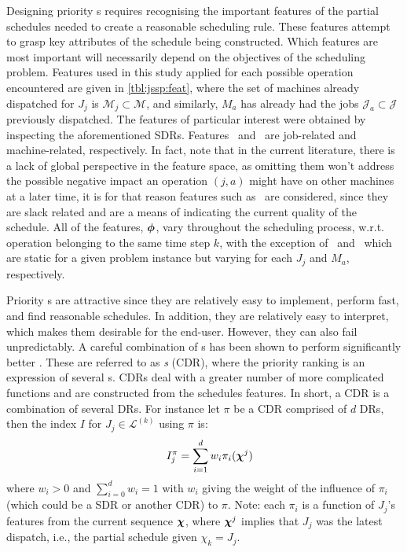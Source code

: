 \documentclass[twocolumn]{svjour3}
\begin{document}
Designing priority \dr s requires recognising the important features of the 
partial schedules needed to create a reasonable scheduling rule. 
These features attempt to grasp key attributes of the schedule being 
constructed. Which features are most important will necessarily depend on the
objectives of the scheduling problem. 
Features used in this study applied for each possible operation encountered 
are given in \cref{tbl:jssp:feat}, where the set of machines already dispatched 
for $J_j$ is $\mathcal{M}_j\subset\mathcal{M}$, and similarly, $M_a$ has 
already had the jobs $\mathcal{J}_a\subset\mathcal{J}$ previously dispatched.
The features of particular interest were obtained by inspecting the 
aforementioned SDRs. Features \phiJobRelated\ and \phiMacRelated\ are 
job-related and machine-related, respectively.
In fact, \cite{Pickardt2013} note that in the current literature, there is a 
lack of global perspective in the feature space, as omitting them won't 
address the possible negative impact an operation $(j,a)$ might have on other 
machines at a later time, it is for that reason features such as 
\phiSlackRelated\ are considered, since they are slack related and are a means 
of indicating the current quality of the schedule.
All of the features, $\bm{\phi}$, vary throughout the scheduling process, 
w.r.t. operation belonging to the same time step $k$, with the exception of 
\phijobTotProcTime\ and \phimacTotProcTime\ which are static for a given 
problem instance but varying for each $J_j$ and $M_a$, respectively. 

Priority \dr s are attractive since they are relatively easy to 
implement, perform fast, and find reasonable schedules. In addition, they are 
relatively easy to interpret, which makes them desirable for the end-user.
However, they can also fail unpredictably. 
A careful combination of \dr s has been shown to perform significantly better 
\cite{Jayamohan04}. These are referred to as \emph{\cdr s} 
(CDR), where the priority ranking is an expression of several \dr s. 
CDRs deal with a greater number of more complicated functions and are 
constructed from the schedules features. In short, a CDR is a combination 
of several DRs. 
For instance let $\pi$ be a CDR comprised of $d$ DRs, then the index $I$ for 
$J_j\in\mathcal{L}^{(k)}$ using $\pi$ is:
\begin{equation}\quad I_j^{\pi} = \sum_{i=1}^d w_i \pi_i(\bm \chi^j) 
\label{eq:CDR}
\end{equation}
where $w_i>0$ and $\sum_{i=0}^d w_i = 1$ with $w_i$ giving the weight of the 
influence of $\pi_i$ (which could be a SDR or another CDR) to $\pi$. Note: 
each $\pi_i$ is a function of $J_j$'s features from the current sequence 
$\bm \chi$, where $\bm \chi^j$ implies that $J_j$ was the latest dispatch, i.e., the 
partial schedule given $\chi_k=J_j$.
\end{document}
